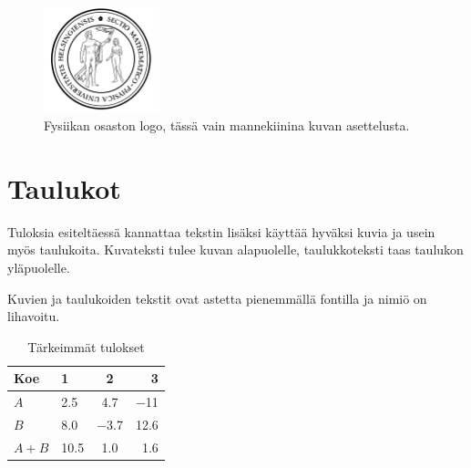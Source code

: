 \documentclass[finnish,twoside,openright,utf]{HYgradu}
\begin{document}
\begin{figure}[h!] 
\centering %
\includegraphics[width=0.3\textwidth]{sinetti.png}
\caption{Fysiikan osaston logo, tässä vain mannekiinina kuvan asettelusta.}
\label{fig:sinetti}
\end{figure}

\section{Taulukot}

Tuloksia esiteltäessä kannattaa tekstin lisäksi käyttää hyväksi kuvia ja usein myös taulukoita. Kuvateksti tulee kuvan alapuolelle, taulukkoteksti taas taulukon  yläpuolelle.

Kuvien ja taulukoiden tekstit ovat astetta pienemmällä fontilla ja nimiö on lihavoitu.

\begin{table}
\centering
\caption{Tärkeimmät tulokset}
\label{tab:symbols}
\begin{tabular}{l||l c r} %
Koe   & 1 & 2 & 3 \\ 
\hline \hline %
$A$   & \num{2.5}  & \num{4.7}  & \num{-11}  \\
$B$   & \num{8.0}  & \num{-3.7} & \num{12.6} \\
$A+B$ & \num{10.5} & \num{1.0}  & \num{1.6}  \\
\hline
%
\end{tabular}
\end{table}
\end{document}
